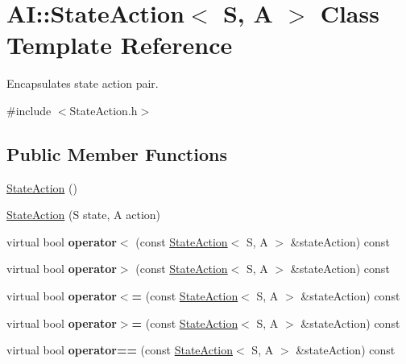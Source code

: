 \hypertarget{classAI_1_1StateAction}{\section{A\-I\-:\-:State\-Action$<$ S, A $>$ Class Template Reference}
\label{classAI_1_1StateAction}
}


Encapsulates state action pair.  




{\ttfamily \#include $<$State\-Action.\-h$>$}

\subsection*{Public Member Functions}
\begin{DoxyCompactItemize}
\item 
\hyperlink{classAI_1_1StateAction_a0afd69cb1b7d577a1b8b51aedffc77bf}{State\-Action} ()
\item 
\hyperlink{classAI_1_1StateAction_ad2a25a219a6941a2e36b0783dd6c01cf}{State\-Action} (S state, A action)
\item 
\hypertarget{classAI_1_1StateAction_a8ba71340cc0993a198d9648ab7df8af8}{virtual bool {\bfseries operator$<$} (const \hyperlink{classAI_1_1StateAction}{State\-Action}$<$ S, A $>$ \&state\-Action) const }\label{classAI_1_1StateAction_a8ba71340cc0993a198d9648ab7df8af8}

\item 
\hypertarget{classAI_1_1StateAction_acc9bfdfd11ea817bc8b478bbd0496f96}{virtual bool {\bfseries operator$>$} (const \hyperlink{classAI_1_1StateAction}{State\-Action}$<$ S, A $>$ \&state\-Action) const }\label{classAI_1_1StateAction_acc9bfdfd11ea817bc8b478bbd0496f96}

\item 
\hypertarget{classAI_1_1StateAction_a1cddf0ba056f1be7be3f0a65d2ea7a1b}{virtual bool {\bfseries operator$<$=} (const \hyperlink{classAI_1_1StateAction}{State\-Action}$<$ S, A $>$ \&state\-Action) const }\label{classAI_1_1StateAction_a1cddf0ba056f1be7be3f0a65d2ea7a1b}

\item 
\hypertarget{classAI_1_1StateAction_a86027cd4244a8913e2b109aabe3191d4}{virtual bool {\bfseries operator$>$=} (const \hyperlink{classAI_1_1StateAction}{State\-Action}$<$ S, A $>$ \&state\-Action) const }\label{classAI_1_1StateAction_a86027cd4244a8913e2b109aabe3191d4}

\item 
\hypertarget{classAI_1_1StateAction_acb219388dc6b7a94b10ae95125b9f7b1}{virtual bool {\bfseries operator==} (const \hyperlink{classAI_1_1StateAction}{State\-Action}$<$ S, A $>$ \&state\-Action) const }\label{classAI_1_1StateAction_acb219388dc6b7a94b10ae95125b9f7b1}


\end{DoxyCompactItemize}
